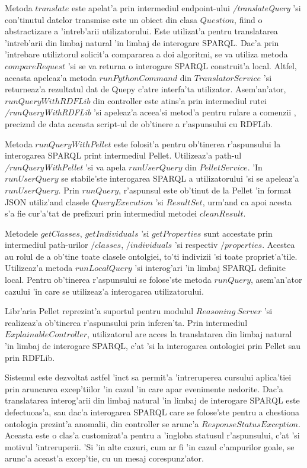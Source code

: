 \documentclass[12pt,a4paper,twoside]{report}
\begin{document}
Metoda $translate$ este apelat'a prin intermediul endpoint-ului {\it /translateQuery} 'si con'tinutul datelor transmise este un obiect din clasa $Question$, fiind o abstractizare a 'intreb'arii utilizatorului. Este utilizat'a pentru translatarea 'intreb'arii din limbaj natural 'in limbaj de interogare SPARQL.  Dac'a prin 'intrebare utiliztorul solicit'a compararea a doi algoritmi, se va utiliza metoda $compareRequest$ 'si se va returna o interogare SPARQL construit'a local. Altfel, aceasta apeleaz'a metoda $runPythonCommand$ din $TranslatorService$ 'si returneaz'a rezultatul dat de Quepy c'atre interfa'ta utilizator. Asem'an'ator, $runQueryWithRDFLib$ din controller este atins'a prin intermediul rutei {\it /runQueryWithRDFLib} 'si apeleaz'a aceea'si metod'a pentru rulare a comenzii , preciz\ia nd de data aceasta script-ul de ob'tinere a r'aspunsului cu RDFLib.

Metoda $runQueryWithPellet$ este folosit'a pentru ob'tinerea r'aspunsului la interogarea SPARQL print intermediul Pellet. Utilizeaz'a path-ul {\it /runQueryWithPellet} 'si va apela $runUserQuery$ din $PelletService$. 'In $runUserQuery$ se stabile'ste interogarea SPARQL a utilizatorului 'si se apeleaz'a $runUserQuery$. Prin $runQuery$, r'aspunsul este ob'tinut de la Pellet 'in format JSON utiliz'and clasele $QueryExecution$ 'si $ResultSet$, urm'and ca apoi acesta s'a fie cur'a'tat de prefixuri prin intermediul metodei $cleanResult$.

Metodele $getClasses$, $getIndividuals$ 'si $getProperties$ sunt accestate prin intermediul path-urilor $/classes$, $/individuals$ 'si respectiv $/properties$. Acestea au rolul de a ob'tine toate clasele ontolgiei, to'ti indivizii 'si toate propriet'a'tile. Utilizeaz'a metoda $runLocalQuery$ 'si interog'ari 'in limbaj SPARQL definite local. Pentru ob'tinerea r'aspunsului se folose'ste metoda $runQuery$, asem'an'ator cazului 'in care se utilizeaz'a interogarea utilizatorului.

Libr'aria Pellet reprezint'a suportul pentru modulul $Reasoning\ Server$ 'si realizeaz'a ob'tinerea r'aspunsului prin inferen'ta. Prin intermediul $ExplainableController$, utilizatorul are acces la translatarea din limbaj natural 'in limbaj de interogare SPARQL, c'at 'si la interogarea ontologiei prin Pellet sau prin RDFLib.

Sistemul este dezvoltat astfel 'inc\ia t sa permit'a 'intreruperea cursului aplica'tiei prin aruncarea excep'tiilor 'in cazul 'in care apar evenimente nedorite. Dac'a translatarea interog'arii din limbaj natural 'in limbaj de interogare SPARQL este defectuoas'a, sau dac'a interogarea SPARQL care se folose'ste pentru a chestiona ontologia prezint'a anomalii, din controller se arunc'a $ResponseStatusException$. Aceasta este o clas'a customizat'a pentru a 'ingloba statusul r'aspunsului, c'at 'si motivul 'intreruperii. 'Si 'in alte cazuri, cum ar fi 'in cazul c'ampurilor goale, se arunc'a aceast'a excep'tie, cu un mesaj corespunz'ator.
\end{document}
